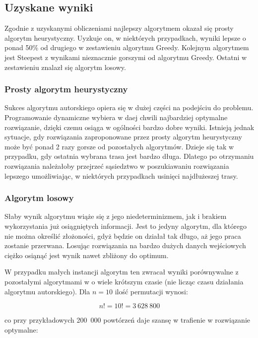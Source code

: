 \subsection{Uzyskane wyniki}
                                                                       
Zgodnie z uzyskanymi obliczeniami najlepszy algorytmem okazał się prosty algorytm 
heurystyczny. Uyzkuje on, w niektórych przypadkach, wyniki lepsze o ponad 50\% od
drugiego w zestawieniu algorytmu Greedy. Kolejnym algorytmem jest Steepest z wynikami 
nieznacznie gorszymi od algorytmu Greedy. Ostatni w zestawieniu znalazł się algorytm 
losowy.

\subsubsection{Prosty algorytm heurystyczny}

Sukces algorytmu autorskiego opiera się w dużej części na podejściu do problemu. 
Programowanie dynamiczne wybiera w daej chwili najbardziej optymalne rozwiązanie, 
dzięki czemu osiąga w ogólności bardzo dobre wyniki. Istnieją jednak sytuacje, gdy 
rozwiązania zaproponowane przez prosty algorytm heurystyczny może być ponad 2 razy 
gorsze od pozostałych algorytmów. Dzieje się tak w przypadku, gdy ostatnia wybrana 
trasa jest bardzo długa. Dlatego po otrzymaniu rozwiązania należałoby przejrzeć 
sąsiedztwo w poszukiawaniu rozwiązania lepszego umożliwiając, w niektórych przypadkach
usinięci najdłużeszej trasy.

\subsubsection{Algorytm losowy}

Słaby wynik algorytmu wiąże się z jego niedeterminizmem, jak i brakiem wykorzystania 
już osiągniętych informacji. Jest to jedyny algorytm, dla którego nie można określić 
złożoności, gdyż będzie on działał tak długo, aż jego praca zostanie przerwana. Losując 
rozwiązania na bardzo dużych danych wejściowych ciężko osiąnąć jest wynik nawet zbliżony 
do optimum. 

W przypadku małych instancji algorytm ten zwracał wyniki porównywalne z 
pozostałymi algorytmami w o wiele krótszym czasie (nie licząc czasu działania algorytmu
autorskiego). Dla $ n = 10 $ ilość permutacji wynosi:

$$ n! = 10! = 3~628~800 $$

co przy przykładowych 200~000 powtórzeń daje szansę w trafienie w rozwiązanie optymalne:

